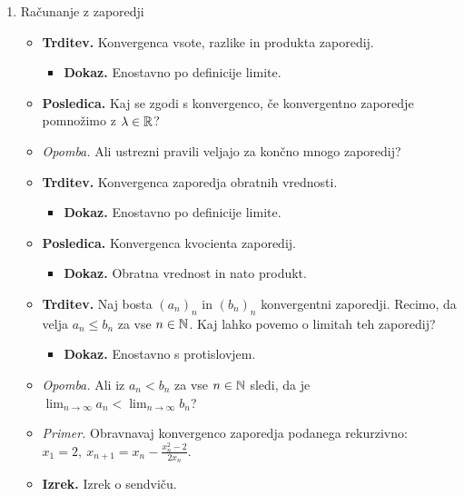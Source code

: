 \begin{enumerate}
    \newpage
    \item Računanje z zaporedji
    \begin{itemize}
        \item \colorbox{blue!30}{\textbf{Trditev.}}  Konvergenca vsote, razlike in produkta zaporedij.
        \begin{itemize}
            \item  \colorbox{green!30}{\textbf{Dokaz.}} Enostavno po definicije limite.            
        \end{itemize}
        \item \colorbox{orange!30}{\textbf{Posledica.}} Kaj se zgodi s konvergenco, če konvergentno zaporedje pomnožimo z $\lambda \in \mathbb{R}$?
        \item \colorbox{yellow!30}{\emph{Opomba.}} Ali ustrezni pravili veljajo za končno mnogo zaporedij?
        \item \colorbox{blue!30}{\textbf{Trditev.}}  Konvergenca zaporedja obratnih vrednosti.
        \begin{itemize}
            \item  \colorbox{green!30}{\textbf{Dokaz.}} Enostavno po definicije limite.            
        \end{itemize}
        \item \colorbox{orange!30}{\textbf{Posledica.}} Konvergenca kvocienta zaporedij.
        \begin{itemize}
            \item  \colorbox{green!30}{\textbf{Dokaz.}} Obratna vrednost in nato produkt.
        \end{itemize}
        \item \colorbox{blue!30}{\textbf{Trditev.}}  Naj bosta $(a_n)_n$ in $(b_n)_n$ konvergentni zaporedji. Recimo, da velja $a_n \leq b_n$ za vse $n \in \mathbb{N}$. Kaj lahko povemo o limitah teh zaporedij?
        \begin{itemize}
            \item  \colorbox{green!30}{\textbf{Dokaz.}} Enostavno s protislovjem.
        \end{itemize}
        \item \colorbox{yellow!30}{\emph{Opomba.}} Ali iz $a_n < b_n$ za vse $n \in \mathbb{N}$ sledi, da je $\lim_{n \to \infty} a_n < \lim_{n \to \infty} b_n$?
        \item \colorbox{yellow!30}{\emph{Primer.}} Obravnavaj konvergenco zaporedja podanega rekurzivno: $x_1 = 2, \ x_{n+1} = x_n - \frac{x_{n}^2-2}{2x_n}$.
        \item \colorbox{blue!30}{\textbf{Izrek.}} Izrek o sendviču.

\end{itemize}
\end{enumerate}
